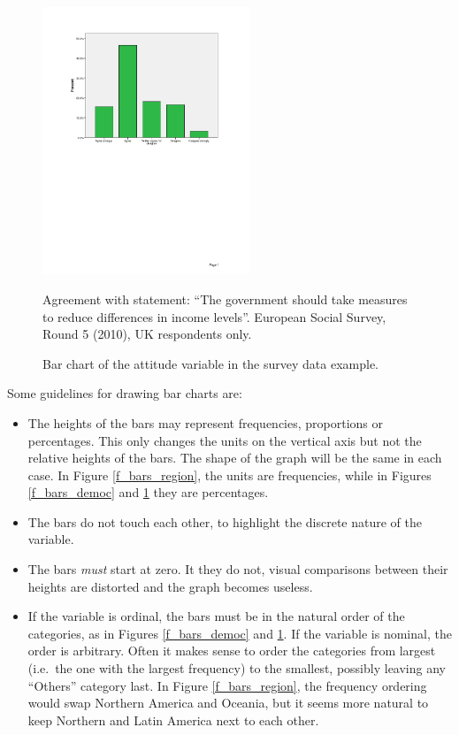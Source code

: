 \begin{figure}
\caption{Bar chart of the attitude variable
in the survey data example.}
\label{f_bars_attitude}
\begin{center}
\includegraphics[height=8cm]{bar_attitude}

\scriptsize{
Agreement with statement: ``The government should
take measures to reduce differences in income levels''.
European Social Survey, Round 5 (2010), UK respondents only.}
\end{center}
\end{figure}


Some guidelines for drawing bar charts are:
\begin{itemize}
\item
The heights of the bars may represent frequencies, proportions or
percentages. This only changes the units on the vertical axis
but not the relative heights of the bars. The shape of the graph
will be the same in each case. In Figure \ref{f_bars_region}, the units
are frequencies, while in Figures \ref{f_bars_democ} and
\ref{f_bars_attitude} they are percentages.
\item
The bars do not touch each other, to highlight the discrete nature of
the variable.
\item
The bars \emph{must} start at zero. It they do not, visual comparisons
between their heights are distorted and the graph becomes useless.
\item
If the variable is ordinal, the bars must be in the natural order of the
categories, as in Figures
\ref{f_bars_democ} and
\ref{f_bars_attitude}.
If the variable is nominal, the order is arbitrary. Often it
makes sense to order the categories from largest (i.e.\ the one with the
largest frequency) to the smallest, possibly leaving any ``Others''
category last. In Figure \ref{f_bars_region}, the
frequency ordering would swap Northern America and
Oceania, but it seems
more natural to keep Northern and Latin America
next to each other.
\end{itemize}

